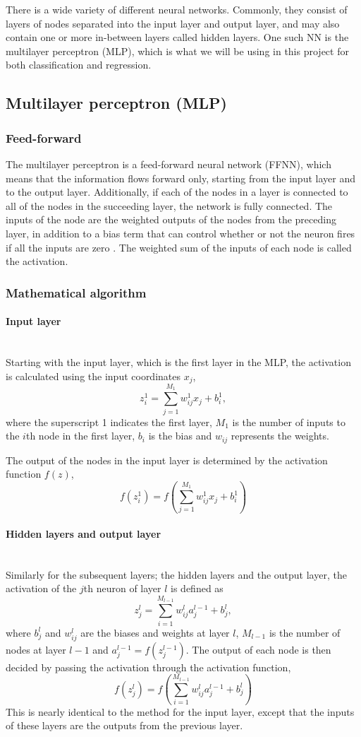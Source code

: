 \documentclass[a4paper, 11pt, twocolumn]{article}
\newcommand{\myparagraph}[1]{\paragraph{#1}\mbox{}\\}
\begin{document}
There is a wide variety of different neural networks. Commonly, they consist of
layers of nodes separated into the input layer and output layer, and may also
contain one or more in-between layers called hidden layers. One such NN is the
multilayer perceptron (MLP), which is what we will be using in this project for
both classification and regression.
\subsection{Multilayer perceptron (MLP)}

\subsubsection{Feed-forward  }
The multilayer perceptron is a feed-forward neural network (FFNN), which means
that the information flows forward only, starting from the input layer and to
the output layer. Additionally, if each of the nodes in a layer is connected to
all of the nodes in the succeeding layer, the network is fully connected. The
inputs of the node are the weighted outputs of the nodes from the preceding
layer, in addition to a bias term that can control whether or not the neuron
fires if all the inputs are zero \cite{ML_algo}. The weighted sum of the inputs
of each node is called the activation.

\subsubsection*{Mathematical algorithm} \myparagraph{Input layer}
Starting with the input layer, which is the first layer in the MLP, the
activation is calculated using the input coordinates $x_j$,
\begin{equation}
z_i^1 = \sum^{M_1}_{j=1}w_{ij}^1x_j + b_i^1,
\end{equation}
where the superscript 1 indicates the first layer, $M_1$ is the number of inputs
to the $i$th node in the first layer, $b_i$ is the bias and $w_{ij}$ represents
the weights.

The output of the nodes in the input layer is determined by the activation
function $f(z)$,
\begin{equation}
f(z_i^1) = f \left( \sum^{M_1}_{j=1}w_{ij}^1x_j + b_i^1 \right)
\end{equation}
\myparagraph{Hidden layers and output layer}
Similarly for the subsequent layers; the hidden layers and the output layer, the
activation of the $j$th neuron of layer $l$ is defined as
\begin{equation}
z_j^l = \sum_{i=1}^{M_{l-1}} w_{ij}^la_j^{l-1} + b_j^l,
\end{equation}
where $b_j^l$ and $w_{ij}^l$ are the biases and weights at layer $l$, ${M_{l-1}}$
is the number of nodes at layer $l-1$ and $a_j^{l-1}=f(z_j^{l-1}) $.
The output of each node is then decided by passing the activation through the
activation function,
\begin{equation}
 f(z_j^l) =f \left(     \sum_{i=1}^{M_{l-1}} w_{ij}^la_j^{l-1} + b_j^l \right)
\end{equation}
This is nearly identical to the method for the input layer, except that the
inputs of these layers are the outputs from the previous layer.
\end{document}

